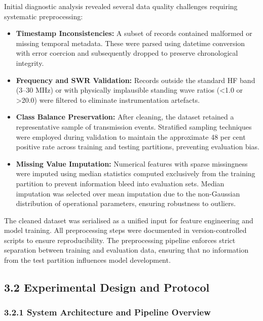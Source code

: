Initial diagnostic analysis revealed several data quality challenges
requiring systematic preprocessing:

\begin{itemize}
\tightlist
\item
  \textbf{Timestamp Inconsistencies:} A subset of records contained
  malformed or missing temporal metadata. These were parsed using
  datetime conversion with error coercion and subsequently dropped to
  preserve chronological integrity.
\item
  \textbf{Frequency and SWR Validation:} Records outside the standard HF
  band (3--30 MHz) or with physically implausible standing wave ratios
  (\textless1.0 or \textgreater20.0) were filtered to eliminate
  instrumentation artefacts.
\item
  \textbf{Class Balance Preservation:} After cleaning, the dataset
  retained a representative sample of transmission events. Stratified
  sampling techniques were employed during validation to maintain the
  approximate 48 per cent positive rate across training and testing
  partitions, preventing evaluation bias.
\item
  \textbf{Missing Value Imputation:} Numerical features with sparse
  missingness were imputed using median statistics computed exclusively
  from the training partition to prevent information bleed into
  evaluation sets. Median imputation was selected over mean imputation
  due to the non-Gaussian distribution of operational parameters,
  ensuring robustness to outliers.
\end{itemize}

The cleaned dataset was serialised as a unified input for feature
engineering and model training. All preprocessing steps were documented
in version-controlled scripts to ensure reproducibility. The
preprocessing pipeline enforces strict separation between training and
evaluation data, ensuring that no information from the test partition
influences model development.

\subsection{3.2 Experimental Design and
Protocol}\label{experimental-design-and-protocol}

\subsubsection{3.2.1 System Architecture and Pipeline
Overview}\label{system-architecture-and-pipeline-overview}

